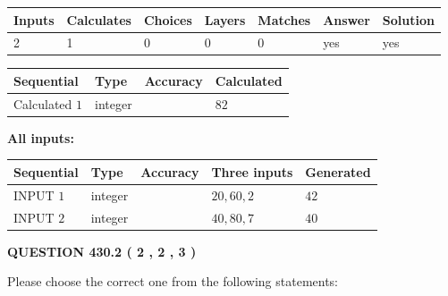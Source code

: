\documentclass[12pt]{article}
\begin{document}
 
\noindent{}
 
 

 
   
   
   
   
\noindent\begin{tabular}{|l|l|l|l|l|l|l|}
 \hline
Inputs & Calculates & Choices & Layers & Matches & Answer & Solution \\ \hline
 2  & 
 1  & 
 0
  & 
 0  & 
 0  & 
  yes & 
  yes 
  \\ \hline
 \end{tabular}
   
   
   
   
\noindent{}
   
   
  
  
\noindent\begin{tabular}{|l|l|l|l|}
\hline
 Sequential & Type & Accuracy & Calculated \\ 
\hline
 
 
  Calculated $  1 $ & integer &  & 
  $ 82 $ 
 \\  \hline  
 \end{tabular}
   
   
   
   
\noindent\vspace{0.1in}\hspace{-0.08in} {\textbf{\Large{All inputs: }}}
   
   
  
  
\noindent\begin{tabular}{|l|l|l|l|l|}
\hline
 Sequential & Type & Accuracy & Three inputs & Generated \\ 
\hline
 
 
  INPUT $  1 $ & integer &  & $
 20
 , 
 60
 , 
 2
 $ & $ 42 $ 
 \\  \hline  
 
 
  INPUT $  2 $ & integer &  & $
 40
 , 
 80
 , 
 7
 $ & $ 40 $ 
 \\  \hline  
 \end{tabular}
   
   
  
\vspace{0.2in}
  
{\textbf{\Large{QUESTION
430.2 
 ( 2 , 2 , 3 )
}}}
  
  
Please choose the correct one from the following statements:
 
\end{document}
